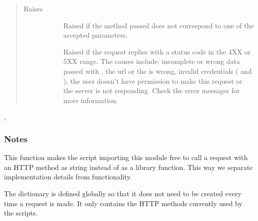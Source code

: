 \documentclass[letterpaper,10pt,english]{sphinxmanual}
\begin{document}
\begin{fulllineitems}
\begin{quote}
\begin{description}
\begin{description}
\end{description}

\item[{Raises}] \leavevmode\begin{description}
\item[{}] \leavevmode
Raised if the method passed does not correspond to one of the accepted
parameters.

\item[{}] \leavevmode
Raised if the request replies with a status code in the 4XX or 5XX range.
The causes include: incomplete or wrong data passed with , the 
url or the  is wrong, invalid credentials ( and ),
the user doesn’t have permission to make this request or the server is not
responding. Check the error messages for more information.

\end{description}

\end{description}\end{quote}




, 


\subsubsection*{Notes}

This function makes the script importing this module free to call a request
with an HTTP method as string instead of as a library function. This way we
separate implementation details from functionality.

The  dictionary is defined globally so that it does not need to be
created every time a request is made. It only contains the HTTP methods
currently used by the scripts.

\end{fulllineitems}

\end{document}
